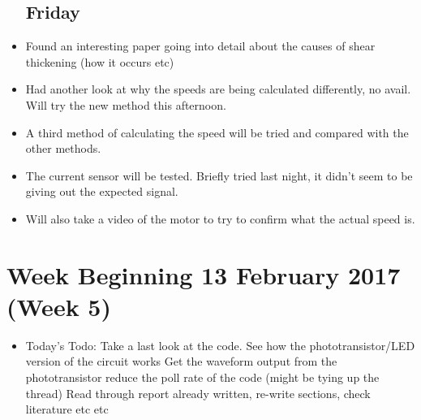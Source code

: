 \documentclass[a4]{report}
\begin{document}
\begin{itemize}
		\subsection*{Friday}
		\item Found an interesting paper going into detail about the causes of shear thickening (how it occurs etc)
		\item Had another look at why the speeds are being calculated differently, no avail. Will try the new method this afternoon.
		\item A third method of calculating the speed will be tried and compared with the other methods.
		\item The current sensor will be tested. Briefly tried last night, it didn't seem to be giving out the expected signal.
		\item Will also take a video of the motor to try to confirm what the actual speed is.
	\end{itemize}
	\newpage
	\section{Week Beginning 13 February 2017 (Week 5)}
	\begin{itemize}
		\item Today's Todo:
		\subitem Take a last look at the code.
		\subitem See how the phototransistor/LED version of the circuit works
		\subitem Get the waveform output from the phototransistor
		\subitem reduce the poll rate of the code (might be tying up the thread)
		\subitem Read through report already written, re-write sections, check literature etc etc
	\end{itemize}
	\newpage
\end{document}
